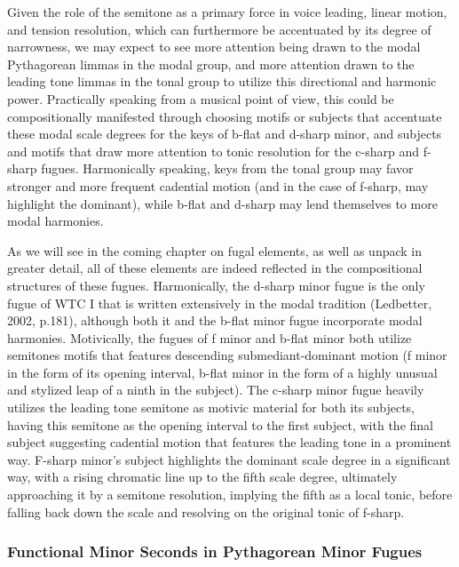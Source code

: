 Given the role of the semitone as a primary force in voice leading,
linear motion, and tension resolution, which can furthermore be
accentuated by its degree of narrowness, we may expect to see more
attention being drawn to the modal Pythagorean limmas in the modal
group, and more attention drawn to the leading tone limmas in the tonal
group to utilize this directional and harmonic power. Practically
speaking from a musical point of view, this could be compositionally
manifested through choosing motifs or subjects that accentuate these
modal scale degrees for the keys of b-flat and d-sharp minor, and
subjects and motifs that draw more attention to tonic resolution for the
c-sharp and f-sharp fugues. Harmonically speaking, keys from the tonal
group may favor stronger and more frequent cadential motion (and in the
case of f-sharp, may highlight the dominant), while b-flat and d-sharp
may lend themselves to more modal harmonies.

As we will see in the coming chapter on fugal elements, as well as
unpack in greater detail, all of these elements are indeed reflected in
the compositional structures of these fugues. Harmonically, the d-sharp
minor fugue is the only fugue of WTC I that is written extensively in
the modal tradition (Ledbetter, 2002, p.181), although both it and the
b-flat minor fugue incorporate modal harmonies. Motivically, the fugues
of f minor and b-flat minor both utilize semitones motifs that features
descending submediant-dominant motion (f minor in the form of its
opening interval, b-flat minor in the form of a highly unusual and
stylized leap of a ninth in the subject). The c-sharp minor fugue
heavily utilizes the leading tone semitone as motivic material for both
its subjects, having this semitone as the opening interval to the first
subject, with the final subject suggesting cadential motion that
features the leading tone in a prominent way. F-sharp minor's subject
highlights the dominant scale degree in a significant way, with a rising
chromatic line up to the fifth scale degree, ultimately approaching it
by a semitone resolution, implying the fifth as a local tonic, before
falling back down the scale and resolving on the original tonic of
f-sharp.

    \subsubsection{Functional Minor Seconds in Pythagorean Minor
Fugues}\label{functional-minor-seconds-in-pythagorean-minor-fugues}


